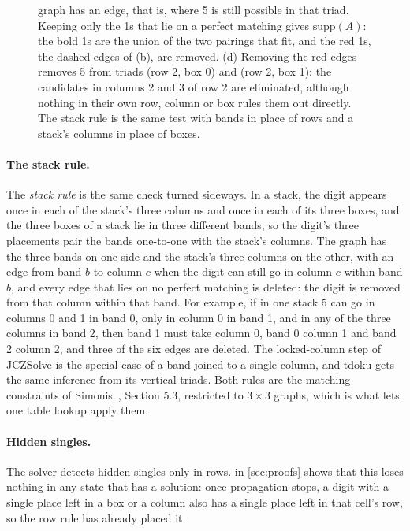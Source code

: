 \documentclass[11pt]{article}
\theoremstyle{definition}
\theoremstyle{plain}
\begin{document}
\begin{figure}[tbp]
{graph has an edge, that is, where 5 is still possible in that triad. Keeping only the 1s that lie on a perfect
matching gives $\mathrm{supp}(A)$: the bold 1s are the union of the two pairings that fit, and the red 1s, the dashed
edges of (b), are removed. (d) Removing the red edges removes 5 from triads (row 2, box 0) and (row 2, box 1): the
candidates in columns 2 and 3 of row 2 are eliminated, although nothing in their own row, column or box rules them
out directly. The stack rule is the same test with bands in place of rows and a stack's
columns in place of boxes.}
\label{fig:band}
\end{figure}

\paragraph{The stack rule.} The \emph{stack rule} is the same check turned sideways. In a stack, the digit appears once
in each of the stack's three columns and once in each of its three boxes, and the three boxes of a stack lie in three
different bands, so the digit's three placements pair the bands one-to-one with the stack's columns. The graph has the
three bands on one side and the stack's three columns on the other, with an edge from band $b$ to column $c$ when the
digit can still go in column $c$ within band $b$, and every edge that lies on no perfect matching is deleted: the digit
is removed from that column within that band. For example, if in one stack 5 can go in columns 0 and 1 in band 0, only
in column 0 in band 1, and in any of the three columns in band 2, then band 1 must take column 0, band 0 column 1 and
band 2 column 2, and three of the six edges are deleted. The locked-column step of JCZSolve is the special case of a
band joined to a single column, and tdoku gets the same inference from its vertical triads. Both rules are the matching
constraints of Simonis~\cite{simonis2005sudoku}, Section 5.3, restricted to $3\times 3$ graphs, which is what lets one
table lookup apply them.

\paragraph{Hidden singles.} The solver detects hidden singles only in rows.  in \cref{sec:proofs} shows that this loses
nothing in any state that has a solution: once propagation stops, a digit with a single place left in a box or a column also has a single place left
in that cell's row, so the row rule has already placed it.
\end{document}
